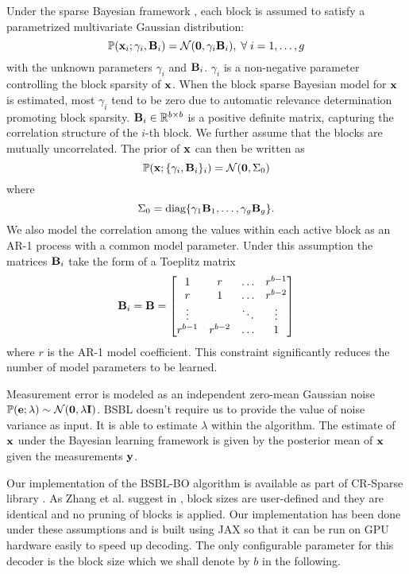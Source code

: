 Under the sparse Bayesian framework \cite{zhang2013extension},
each block is assumed to satisfy a parametrized multivariate
Gaussian distribution:
\begin{equation}
\mathbb{P}(\mathbf{x}_i ; \gamma_i, \mathbf{B}_i) 
= \mathcal{N}(\mathbf{0}, \gamma_i \mathbf{B}_i), \; \forall \; i=1,\dots,g
\end{equation}
with the unknown parameters $\gamma_i$ and $\mathbf{B}_i$.
$\gamma_i$ is a non-negative parameter controlling the
block sparsity of $\mathbf{x}$. When the block sparse Bayesian
model for $\mathbf{x}$ is estimated, most $\gamma_i$ tend to
be zero due to automatic relevance determination
\cite{tipping2001sparse} promoting block sparsity.
$\mathbf{B}_i \in \mathbb{R}^{b \times b}$ is a positive definite
matrix, capturing the correlation structure of the $i$-th
block.
We further assume that the blocks are mutually uncorrelated.
The prior of $\mathbf{x}$ can then be written as
\begin{equation}
\mathbb{P}(\mathbf{x}; \{ \gamma_i, \mathbf{B}_i\}_i ) = \mathcal{N}(\mathbf{0}, \Sigma_0)
\end{equation}
where
\begin{equation}
\Sigma_0 = \text{diag}\{\gamma_1 \mathbf{B}_1, \dots, \gamma_g \mathbf{B}_g \}.
\end{equation}
We also model the correlation among the values
within each active block as an AR-1 process
with a common model parameter.
Under this assumption the matrices
$\mathbf{B}_i$ take the form of a Toeplitz matrix
\begin{equation}
\mathbf{B}_i = \mathbf{B} = \begin{bmatrix}
1 & r & \dots & r^{b-1}\\
r & 1 & \dots & r^{b-2}\\
\vdots &  & \ddots & \vdots\\
r^{b-1} & r^{b-2} & \dots & 1
\end{bmatrix}
\end{equation}
where $r$ is the AR-1 model coefficient.
This constraint significantly reduces
the number of model parameters to be learned.

Measurement error is modeled as an independent zero-mean Gaussian
noise $\mathbb{P}(\mathbf{e}; \lambda) \sim \mathcal{N}(\mathbf{0}, \lambda \mathbf{I})$.
BSBL doesn't require us to provide the value of noise variance
as input.
It is able to estimate $\lambda$ within the algorithm.
The estimate of $\mathbf{x}$ under the Bayesian learning framework
is given by the posterior mean of $\mathbf{x}$ given the measurements $\mathbf{y}$.

Our implementation of the BSBL-BO algorithm is available as part of
CR-Sparse library \cite{kumar2021cr}.
As Zhang et al. suggest in \cite{zhang2012compressed},
block sizes are user-defined and they are identical and
no pruning of blocks is applied. Our implementation has been
done under these assumptions and is built using JAX so that it can
be run on GPU hardware easily to speed up decoding.
The only configurable parameter for this decoder is the block size
which we shall denote by $b$ in the following.

